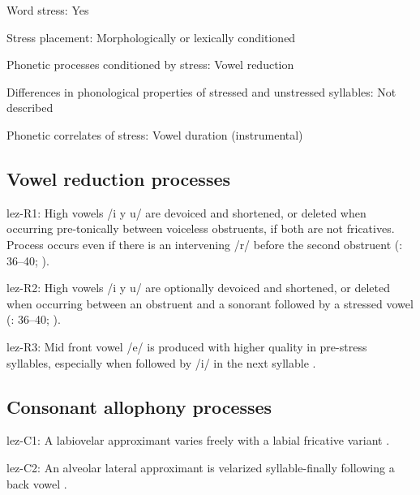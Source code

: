 {\begin{appendixdesc}
\item[Word stress:] Yes

\item[Stress placement:] Morphologically or lexically conditioned

\item[Phonetic processes conditioned by stress:] Vowel reduction

\item[Differences in phonological properties of stressed and unstressed syllables:] Not described

\item[Phonetic correlates of stress:] Vowel duration (instrumental)
\end{appendixdesc}
\subsection*{Vowel reduction processes}
\begin{appendixdesc}

\item[lez-R1:] High vowels /i y u/ are devoiced and shortened, or deleted when occurring pre-tonically between voiceless obstruents, if both are not fricatives. Process occurs even if there is an intervening /r/ before the second obstruent (\citealt{Haspelmath1993}: 36--40; \citealt{ChitoranBabaliyeva2007}).

\item[lez-R2:] High vowels /i y u/ are optionally devoiced and shortened, or deleted when occurring between an obstruent and a sonorant followed by a stressed vowel (\citealt{Haspelmath1993}: 36--40; \citealt{ChitoranBabaliyeva2007}).

\item[lez-R3:] Mid front vowel /e/ is produced with higher quality in pre-stress syllables, especially when followed by /i/ in the next syllable \citep[32]{Haspelmath1993}.
\end{appendixdesc}
\subsection*{Consonant allophony processes}
\begin{appendixdesc}

\item[lez-C1:] A labiovelar approximant varies freely with a labial fricative variant \citep[35]{Haspelmath1993}.

\item[lez-C2:] An alveolar lateral approximant is velarized syllable-finally following a back vowel \citep[35]{Haspelmath1993}.
\end{appendixdesc}
}
